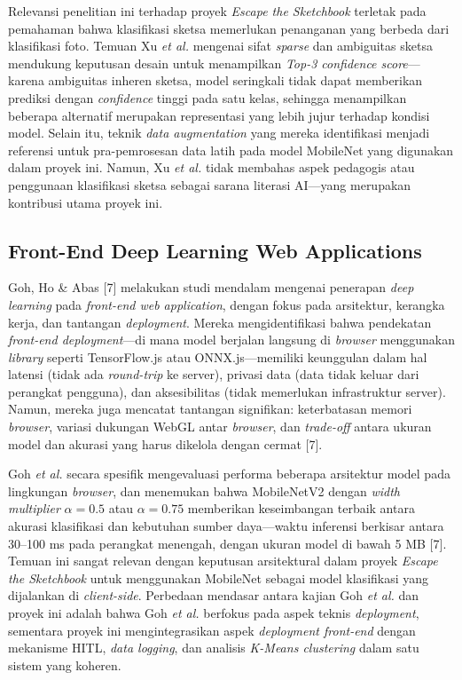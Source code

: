 \documentclass[12pt,oneside]{report}
\begin{document}
Relevansi penelitian ini terhadap proyek \textit{Escape the Sketchbook} terletak pada pemahaman bahwa klasifikasi sketsa memerlukan penanganan yang berbeda dari klasifikasi foto. Temuan Xu \textit{et al.} mengenai sifat \textit{sparse} dan ambiguitas sketsa mendukung keputusan desain untuk menampilkan \textit{Top-3 confidence score}—karena ambiguitas inheren sketsa, model seringkali tidak dapat memberikan prediksi dengan \textit{confidence} tinggi pada satu kelas, sehingga menampilkan beberapa alternatif merupakan representasi yang lebih jujur terhadap kondisi model. Selain itu, teknik \textit{data augmentation} yang mereka identifikasi menjadi referensi untuk pra-pemrosesan data latih pada model MobileNet yang digunakan dalam proyek ini. Namun, Xu \textit{et al.} tidak membahas aspek pedagogis atau penggunaan klasifikasi sketsa sebagai sarana literasi AI—yang merupakan kontribusi utama proyek ini.

\subsection{Front-End Deep Learning Web Applications}
\label{subsec:penelitian-frontend-dl}

Goh, Ho \& Abas [7] melakukan studi mendalam mengenai penerapan \textit{deep learning} pada \textit{front-end web application}, dengan fokus pada arsitektur, kerangka kerja, dan tantangan \textit{deployment}. Mereka mengidentifikasi bahwa pendekatan \textit{front-end deployment}—di mana model berjalan langsung di \textit{browser} menggunakan \textit{library} seperti TensorFlow.js atau ONNX.js—memiliki keunggulan dalam hal latensi (tidak ada \textit{round-trip} ke server), privasi data (data tidak keluar dari perangkat pengguna), dan aksesibilitas (tidak memerlukan infrastruktur server). Namun, mereka juga mencatat tantangan signifikan: keterbatasan memori \textit{browser}, variasi dukungan WebGL antar \textit{browser}, dan \textit{trade-off} antara ukuran model dan akurasi yang harus dikelola dengan cermat [7].

Goh \textit{et al.} secara spesifik mengevaluasi performa beberapa arsitektur model pada lingkungan \textit{browser}, dan menemukan bahwa MobileNetV2 dengan \textit{width multiplier} $\alpha = 0.5$ atau $\alpha = 0.75$ memberikan keseimbangan terbaik antara akurasi klasifikasi dan kebutuhan sumber daya—waktu inferensi berkisar antara 30--100 ms pada perangkat menengah, dengan ukuran model di bawah 5 MB [7]. Temuan ini sangat relevan dengan keputusan arsitektural dalam proyek \textit{Escape the Sketchbook} untuk menggunakan MobileNet sebagai model klasifikasi yang dijalankan di \textit{client-side}. Perbedaan mendasar antara kajian Goh \textit{et al.} dan proyek ini adalah bahwa Goh \textit{et al.} berfokus pada aspek teknis \textit{deployment}, sementara proyek ini mengintegrasikan aspek \textit{deployment front-end} dengan mekanisme HITL, \textit{data logging}, dan analisis \textit{K-Means clustering} dalam satu sistem yang koheren.
\end{document}
